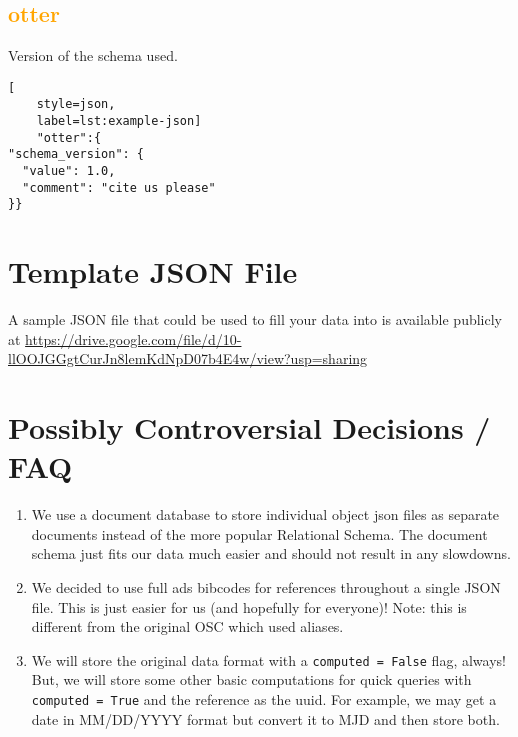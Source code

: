 \documentclass[tighten]{aastex631}
\newcommand{\element}[1]{\textcolor{orange}{#1}}
\begin{document}
\subsection{\element{otter}} \label{sec:otter}

Version of the schema used.
\begin{lstlisting}[
    style=json,
    label=lst:example-json]
    "otter":{
"schema_version": {
  "value": 1.0,
  "comment": "cite us please"
}}
\end{lstlisting}

\section{Template JSON File}
A sample JSON file that could be used to fill your data into is available publicly at \url{https://drive.google.com/file/d/10-llOOJGGgtCurJn8lemKdNpD07b4E4w/view?usp=sharing}

\section{Possibly Controversial Decisions / FAQ}
\begin{enumerate}
    \item We use a document database to store individual object json files as separate documents instead of the more popular Relational Schema. The document schema just fits our data much easier and should not result in any slowdowns.
    \item We decided to use full ads bibcodes for references throughout a single JSON file. This is just easier for us (and hopefully for everyone)! Note: this is different from the original OSC which used aliases.
    \item We will store the original data format with a \texttt{computed = False} flag, always! But, we will store some other basic computations for quick queries with \texttt{computed = True} and the reference as the uuid. For example, we may get a date in MM/DD/YYYY format but convert it to MJD and then store both.
\end{enumerate}



\end{document}
